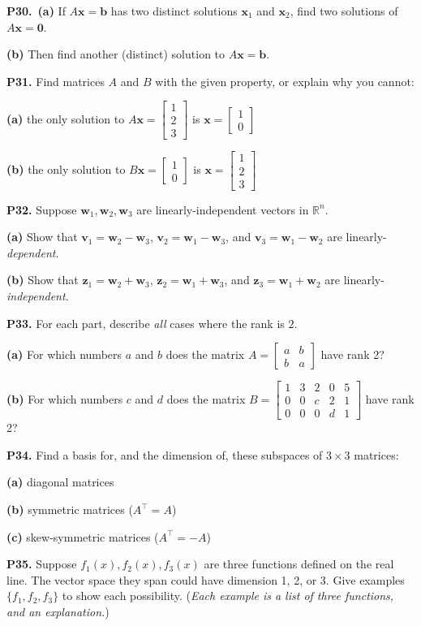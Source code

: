 \documentclass[12pt]{amsart}
\newcommand{\bb}{\bm{b}}
\newcommand{\bv}{\bm{v}}
\newcommand{\bw}{\bm{w}}
\newcommand{\bx}{\bm{x}}
\newcommand{\bz}{\bm{z}}
\newcommand{\bzero}{\bm{0}}
\newcommand{\RR}{\mathbb{R}}
\newcommand{\prob}[1]{\bigskip\noindent\textbf{#1.}\quad }
\newcommand{\epart}[1]{\medskip\noindent\textbf{(#1)}\quad }
\newcommand{\ppart}[1]{\,\textbf{(#1)}\quad }
\begin{document}
\prob{P30}  \ppart{a} If $A\bx = \bb$ has two distinct solutions $\bx_1$ and $\bx_2$, find two solutions of $A \bx=\bzero$.

\epart{b} Then find another (distinct) solution to $A \bx = \bb$.


\prob{P31}  Find matrices $A$ and $B$ with the given property, or explain why you cannot:

\epart{a} the only solution to $A\bx = \begin{bmatrix} 1 \\ 2 \\ 3 \end{bmatrix}$ is $\bx=\begin{bmatrix} 1 \\ 0 \end{bmatrix}$

\epart{b} the only solution to $B\bx = \begin{bmatrix} 1 \\ 0 \end{bmatrix}$ is $\bx=\begin{bmatrix} 1 \\ 2 \\ 3 \end{bmatrix}$


\prob{P32}  Suppose $\bw_1,\bw_2,\bw_3$ are linearly-independent vectors in $\RR^n$.

\epart{a}  Show that $\bv_1=\bw_2-\bw_3$, $\bv_2=\bw_1-\bw_3$, and $\bv_3=\bw_1-\bw_2$ are linearly-\emph{dependent}.

\epart{b}  Show that $\bz_1=\bw_2+\bw_3$, $\bz_2=\bw_1+\bw_3$, and $\bz_3=\bw_1+\bw_2$ are linearly-\emph{independent}.


\prob{P33}  For each part, describe \emph{all} cases where the rank is $2$.

\epart{a}  For which numbers $a$ and $b$ does the matrix $A = \begin{bmatrix}
a & b \\ b & a \end{bmatrix}$ have rank 2?

\epart{b}  For which numbers $c$ and $d$ does the matrix $B = \begin{bmatrix}
1 & 3 & 2 & 0 & 5 \\ 0 & 0 & c & 2 & 1 \\ 0 & 0 & 0 & d & 1 \end{bmatrix}$ have rank 2?


\prob{P34}  Find a basis for, and the dimension of, these subspaces of $3 \times 3$ matrices:

\epart{a} diagonal matrices

\epart{b} symmetric matrices ($A^\top = A$)

\epart{c} skew-symmetric matrices ($A^\top = -A$)


\prob{P35}  Suppose $f_1(x),f_2(x),f_3(x)$ are three functions defined on the real line.  The vector space they span could have dimension 1, 2, or 3.  Give examples $\{f_1,f_2,f_3\}$ to show each possibility.  (\emph{Each example is a list of three functions, and an explanation.})
\end{document}

